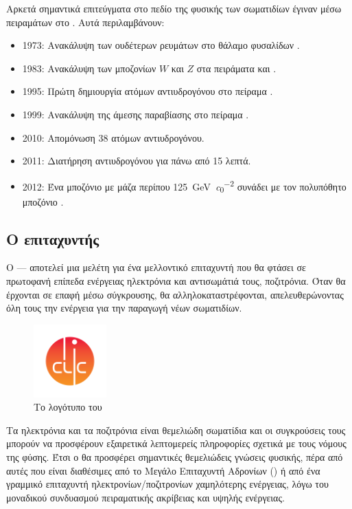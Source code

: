 Αρκετά σημαντικά επιτεύγματα στο πεδίο της φυσικής των σωματιδίων έγιναν μέσω πειραμάτων στο . Αυτά περιλαμβάνουν:
\begin{itemize}
\item 1973: Ανακάλυψη των ουδέτερων ρευμάτων στο θάλαμο φυσαλίδων .
\item 1983: Ανακάλυψη των μποζονίων $W$ και $Z$ στα πειράματα  και .
\item 1995: Πρώτη δημιουργία ατόμων αντιυδρογόνου στο πείραμα .
\item 1999: Ανακάλυψη της άμεσης παραβίασης  στο πείραμα .
\item 2010: Απομόνωση 38 ατόμων αντιυδρογόνου.
\item 2011: Διατήρηση αντιυδρογόνου για πάνω από 15 λεπτά.
\item 2012: Ένα μποζόνιο με μάζα περίπου \SI[per-mode = symbol]{125}{\giga \electronvolt \per  \clight \squared} συνάδει με τον πολυπόθητο μποζόνιο .
\end{itemize}


\subsection{Ο επιταχυντής }


Ο  --- αποτελεί μια μελέτη για ένα μελλοντικό επιταχυντή που θα φτάσει σε πρωτοφανή επίπεδα ενέργειας ηλεκτρόνια και αντισωμάτιά τους, ποζιτρόνια. 
Όταν θα έρχονται σε επαφή μέσω σύγκρουσης, θα αλληλοκαταστρέφονται, απελευθερώνοντας όλη τους την ενέργεια για την παραγωγή νέων σωματιδίων.

\begin{figure}[b]
\includegraphics[trim={12mm 12mm 12mm 12mm},clip=true,width=0.25\textwidth]{images/CLIClogo}
\centering
\caption{Το λογότυπο του }
\label{img:CLIClogo}
\end{figure}

Τα ηλεκτρόνια και τα ποζιτρόνια είναι θεμελιώδη σωματίδια και οι συγκρούσεις τους μπορούν να προσφέρουν εξαιρετικά λεπτομερείς πληροφορίες σχετικά με τους νόμους της φύσης. 
Έτσι ο  θα προσφέρει σημαντικές θεμελιώδεις γνώσεις φυσικής, πέρα από αυτές που είναι διαθέσιμες από το Μεγάλο Επιταχυντή Αδρονίων () ή από ένα γραμμικό επιταχυντή ηλεκτρονίων/ποζιτρονίων χαμηλότερης ενέργειας, λόγω του μοναδικού συνδυασμού πειραματικής ακρίβειας και υψηλής ενέργειας.

